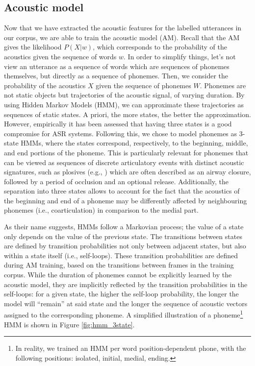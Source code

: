 \subsection{Acoustic model}

Now that we have extracted the acoustic features for the labelled utterances in our corpus, we are able to train the acoustic model (AM). Recall that the AM gives the likelihood $P(X|w)$, which corresponds to the probability of the acoustics given the sequence of words $w$.
In order to simplify things, let's not view an utterance as a sequence of words which are sequences of phonemes themselves, but directly as a sequence of phonemes. Then, we consider the probability of the acoustics $X$ given the sequence of phonemes $W$.
Phonemes are not static objects but trajectories of the acoustic signal, of varying duration. By using Hidden Markov Models (HMM), we can approximate these trajectories as sequences of static states. A priori, the more states, the better the approximation. However, empirically it has been assessed that having three states is a good compromise for ASR systems. Following this, we chose to model phonemes as 3-state HMMs, where the states correspond, respectively, to the beginning, middle, and end portions of the phoneme. This is particularly relevant for phonemes that can be viewed as sequences of discrete articulatory events with distinct acoustic signatures, such as plosives (e.g., ) which are often described as an airway closure, followed by a period of occlusion and an optional release. Additionally, the separation into three states allows to account for the fact that the acoustics of the beginning and end of a phoneme may be differently affected by neighbouring phonemes (i.e., coarticulation) in comparison to the medial part.

As their name suggests, HMMs follow a Markovian process; the value of a state only depends on the value of the previous state. The transitions between states are defined by transition probabilities not only between adjacent states, but also within a state itself (i.e., self-loops). These transition probabilities are defined during AM training, based on the transitions between frames in the training corpus. While the duration of phonemes cannot be explicitly learned by the acoustic model, they are implicitly reflected by the transition probabilities in the self-loops: for a given state, the higher the self-loop probability, the longer the model will ``remain'' at said state and the longer the sequence of acoustic vectors assigned to the corresponding phoneme. A simplified illustration of a phoneme\footnote{In reality, we trained an HMM per word position-dependent phone, with the following positions: isolated, initial, medial, ending.} HMM is shown in Figure \ref{fig:hmm_3state}.

